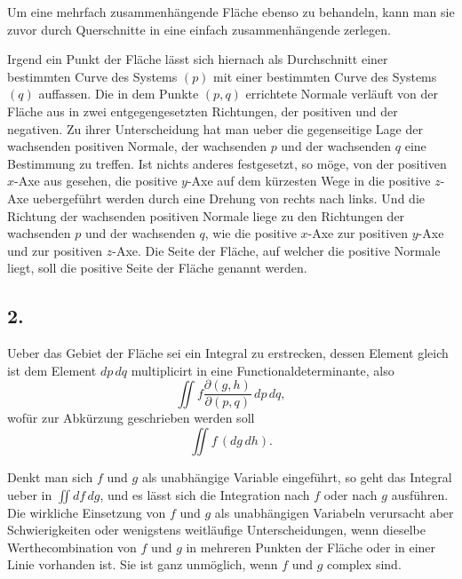 \documentclass[12pt,a4paper]{article}
\begin{document}
Um eine mehrfach zusammenh\"angende Fl\"ache ebenso zu behandeln, kann man sie zuvor durch Querschnitte in eine einfach zusammenh\"angende zerlegen.

Irgend ein Punkt der Fl\"ache l\"asst sich hiernach als Durchschnitt einer bestimmten Curve des Systems $(p)$ mit einer bestimmten Curve des Systems $(q)$ auffassen. Die in dem Punkte $(p,q)$ errichtete Normale verl\"auft von der Fl\"ache aus in zwei entgegengesetzten Richtungen, der positiven und der negativen. Zu ihrer Unterscheidung hat man ueber die gegenseitige Lage der wachsenden positiven Normale, der wachsenden $p$ und der wachsenden $q$ eine Bestimmung zu treffen. Ist nichts anderes festgesetzt, so m\"oge, von der positiven $x$-Axe aus gesehen, die positive $y$-Axe auf dem k\"urzesten Wege in die positive $z$-Axe uebergef\"uhrt werden durch eine Drehung von rechts nach links. Und die Richtung der wachsenden positiven Normale liege zu den Richtungen der wachsenden $p$ und der wachsenden $q$, wie die positive $x$-Axe zur positiven $y$-Axe und zur positiven $z$-Axe. Die Seite der Fl\"ache, auf welcher die positive Normale liegt, soll die positive Seite der Fl\"ache genannt werden.

\subsection*{2.}

Ueber das Gebiet der Fl\"ache sei ein Integral zu erstrecken, dessen Element gleich ist dem Element $dp\,dq$ multiplicirt in eine Functionaldeterminante, also
\[\iint f \frac{\partial(g,h)}{\partial(p,q)}\, dp\, dq,\]
wof\"ur zur Abk\"urzung geschrieben werden soll
\[\iint f \,(dg\, dh).\]

\newpage
Denkt man sich $f$ und $g$ als unabh\"angige Variable eingef\"uhrt, so geht das Integral ueber in $\iint df\, dg$, und es l\"asst sich die Integration nach $f$ oder nach $g$ ausf\"uhren. Die wirkliche Einsetzung von $f$ und $g$ als unabh\"angigen Variabeln verursacht aber Schwierigkeiten oder wenigstens weitl\"aufige Unterscheidungen, wenn dieselbe Werthecombination von $f$ und $g$ in mehreren Punkten der Fl\"ache oder in einer Linie vorhanden ist. Sie ist ganz unm\"oglich, wenn $f$ und $g$ complex sind.
\end{document}
